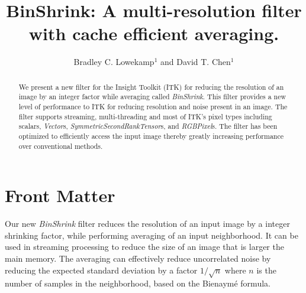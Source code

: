 \documentclass{InsightArticle}
\title{BinShrink: A multi-resolution filter with cache efficient averaging.}
\author{Bradley C. Lowekamp$^{1}$ and David T. Chen$^{1}$}
\newcommand{\IJhandlerIDnumber}{10380}
\begin{document}
%
%
\IJhandlefooter{\IJhandlerIDnumber}


\ifpdf
\else
\fi


\maketitle


\ifhtml
\chapter*{Front Matter\label{front}}
\fi

\begin{abstract}
\noindent
We present a new filter for the Insight Toolkit (ITK) for reducing the
resolution of an image by an integer factor while averaging called
\textit{BinShrink}. This filter provides a new level of performance to
ITK for reducing resolution and noise present in an image. The filter
supports streaming, multi-threading and most of ITK's pixel types
including scalars, \textit{Vector}s,
\textit{SymmetricSecondRankTensor}s, and \textit{RGBPixel}s. The
filter has been optimized to efficiently access the input image thereby
greatly increasing performance over conventional methods.
\end{abstract}

\IJhandlenote{\IJhandlerIDnumber}

\tableofcontents

Our new \textit{BinShrink} filter reduces the resolution of an input
image by a integer shrinking factor, while performing averaging of an
input neighborhood. It can be used in streaming processing to reduce
the size of an image that is larger the main memory. The averaging can
effectively reduce uncorrelated noise by reducing the expected
standard deviation by a factor $1/\sqrt{n}$ where $n$ is the number of
samples in the neighborhood, based on the Bienaymé formula.
\end{document}
